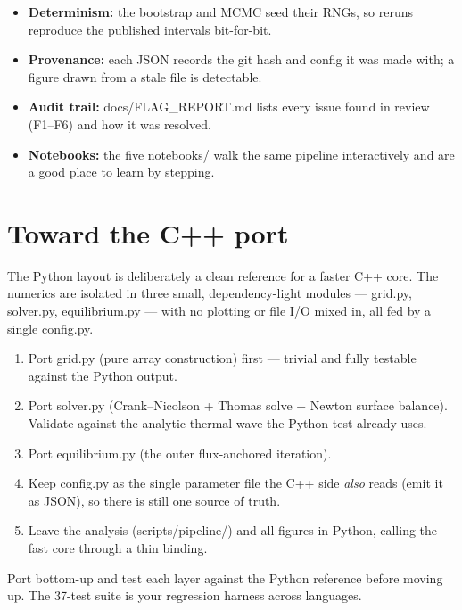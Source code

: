 \documentclass[11pt]{report}
\newcommand{\file}[1]{\textcolor{forest}{\ttfamily #1}}
\begin{document}
\begin{itemize}
\item \textbf{Determinism:} the bootstrap and MCMC seed their RNGs, so
      reruns reproduce the published intervals bit-for-bit.
\item \textbf{Provenance:} each JSON records the git hash and config it was
      made with; a figure drawn from a stale file is detectable.
\item \textbf{Audit trail:} \file{docs/FLAG\_REPORT.md} lists every issue
      found in review (F1--F6) and how it was resolved.
\item \textbf{Notebooks:} the five \file{notebooks/} walk the same
      pipeline interactively and are a good place to learn by stepping.
\end{itemize}

\chapter{Toward the C++ port}

The Python layout is deliberately a clean reference for a faster C++
core. The numerics are isolated in three small, dependency-light modules
--- \file{grid.py}, \file{solver.py}, \file{equilibrium.py} --- with no
plotting or file I/O mixed in, all fed by a single \file{config.py}.

\begin{enumerate}
\item Port \file{grid.py} (pure array construction) first --- trivial and
      fully testable against the Python output.
\item Port \file{solver.py} (Crank--Nicolson + Thomas solve + Newton
      surface balance). Validate against the analytic thermal wave the
      Python test already uses.
\item Port \file{equilibrium.py} (the outer flux-anchored iteration).
\item Keep \file{config.py} as the single parameter file the C++ side
      \emph{also} reads (emit it as JSON), so there is still one source of
      truth.
\item Leave the analysis (\file{scripts/pipeline/}) and all figures in
      Python, calling the fast core through a thin binding.
\end{enumerate}

\begin{tipbox}
Port bottom-up and test each layer against the Python reference before
moving up. The 37-test suite is your regression harness across languages.
\end{tipbox}
\end{document}
